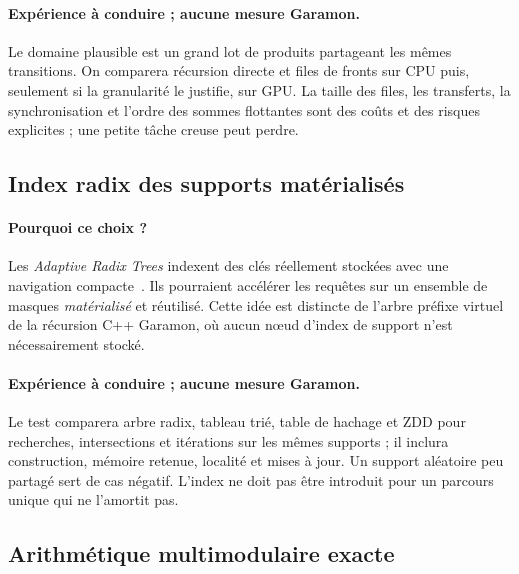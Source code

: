 \documentclass[11pt,a4paper]{article}
\begin{document}
\paragraph{Expérience à conduire ; aucune mesure Garamon.}
Le domaine plausible est un grand lot de produits partageant les mêmes
transitions. On comparera récursion directe et files de fronts sur CPU
puis, seulement si la granularité le justifie, sur GPU. La taille des files,
les transferts, la synchronisation et l'ordre des sommes flottantes sont
des coûts et des risques explicites ; une petite tâche creuse peut perdre.

\subsection{Index radix des supports matérialisés}
\paragraph{Pourquoi ce choix ?}
Les \emph{Adaptive Radix Trees} indexent des clés réellement stockées avec
une navigation compacte~\cite{art}. Ils pourraient accélérer les requêtes
sur un ensemble de masques \emph{matérialisé} et réutilisé. Cette idée est
distincte de l'arbre préfixe virtuel de la récursion C++ Garamon, où aucun
nœud d'index de support n'est nécessairement stocké.

\paragraph{Expérience à conduire ; aucune mesure Garamon.}
Le test comparera arbre radix, tableau trié, table de hachage et ZDD pour
recherches, intersections et itérations sur les mêmes supports ; il inclura
construction, mémoire retenue, localité et mises à jour. Un support aléatoire
peu partagé sert de cas négatif. L'index ne doit pas être introduit pour un
parcours unique qui ne l'amortit pas.

\subsection{Arithmétique multimodulaire exacte}
\end{document}
